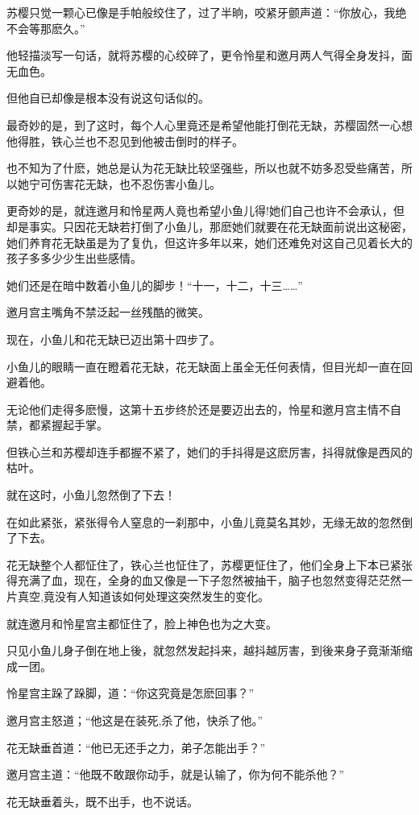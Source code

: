 \documentclass[12pt,oneside]{book}
\begin{document}
苏樱只觉一颗心已像是手帕般绞住了，过了半晌，咬紧牙颤声道：``你放心，我绝不会等那麽久。''

他轻描淡写一句话，就将苏樱的心绞碎了，更令怜星和邀月两人气得全身发抖，面无血色。

但他自已却像是根本没有说这句话似的。

最奇妙的是，到了这时，每个人心里竟还是希望他能打倒花无缺，苏樱固然一心想他得胜，铁心兰也不忍见到他被击倒时的样子。

也不知为了什麽，她总是认为花无缺比较坚强些，所以也就不妨多忍受些痛苦，所以她宁可伤害花无缺，也不忍伤害小鱼儿。

更奇妙的是，就连邀月和怜星两人竟也希望小鱼儿得!她们自己也许不会承认，但却是事实。只因花无缺若打倒了小鱼儿，那麽她们就要在花无缺面前说出这秘密，她们养育花无缺虽是为了复仇，但这许多年以来，她们还难免对这自己见着长大的孩子多多少少生出些感情。

她们还是在暗中数着小鱼儿的脚步！``十一，十二，十三\ldots\ldots{}''

邀月宫主嘴角不禁泛起一丝残酷的微笑。

现在，小鱼儿和花无缺已迈出第十四步了。

小鱼儿的眼睛一直在瞪着花无缺，花无缺面上虽全无任何表情，但目光却一直在回避着他。

无论他们走得多麽慢，这第十五步终於还是要迈出去的，怜星和邀月宫主情不自禁，都紧握起手掌。

但铁心兰和苏樱却连手都握不紧了，她们的手抖得是这麽厉害，抖得就像是西风的枯叶。

就在这时，小鱼儿忽然倒了下去！

在如此紧张，紧张得令人窒息的一刹那中，小鱼儿竟莫名其妙，无缘无故的忽然倒了下去。

花无缺整个人都怔住了，铁心兰也怔住了，苏樱更怔住了，他们全身上下本已紧张得充满了血，现在，全身的血又像是一下子忽然被抽干，脑子也忽然变得茫茫然一片真空,竟没有人知道该如何处理这突然发生的变化。

就连邀月和怜星宫主都怔住了，脸上神色也为之大变。

只见小鱼儿身子倒在地上後，就忽然发起抖来，越抖越厉害，到後来身子竟渐渐缩成一团。

怜星宫主跺了跺脚，道：``你这究竟是怎麽回事？''

邀月宫主怒道；``他这是在装死,杀了他，快杀了他。''

花无缺垂首道：``他已无还手之力，弟子怎能出手？''

邀月宫主道：``他既不敢跟你动手，就是认输了，你为何不能杀他？''

花无缺垂着头，既不出手，也不说话。
\end{document}
